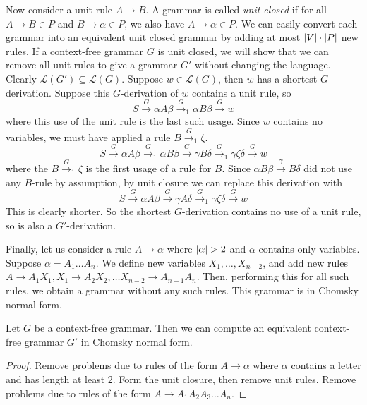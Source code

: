 Now consider a unit rule \( A \to B \).
A grammar is called \emph{unit closed} if for all \( A \to B \in P \) and \( B \to \alpha \in P \), we also have \( A \to \alpha \in P \).
We can easily convert each grammar into an equivalent unit closed grammar by adding at most \( \abs{V} \cdot \abs{P} \) new rules.
If a context-free grammar \( G \) is unit closed, we will show that we can remove all unit rules to give a grammar \( G' \) without changing the language.
Clearly \( \mathcal L(G') \subseteq \mathcal L(G) \).
Suppose \( w \in \mathcal L(G) \), then \( w \) has a shortest \( G \)-derivation.
Suppose this \( G \)-derivation of \( w \) contains a unit rule, so
\[ S \xrightarrow G \alpha A \beta \xrightarrow G_1 \alpha B \beta \xrightarrow G w \]
where this use of the unit rule is the last such usage.
Since \( w \) contains no variables, we must have applied a rule \( B \xrightarrow G_1 \zeta \).
\[ S \xrightarrow G \alpha A \beta \xrightarrow G_1 \alpha B \beta \xrightarrow G \gamma B \delta \xrightarrow G_1 \gamma \zeta \delta \xrightarrow G w \]
where the \( B \xrightarrow G_1 \zeta \) is the first usage of a rule for \( B \).
Since \( \alpha B \beta \xrightarrow \gamma B \delta \) did not use any \( B \)-rule by assumption, by unit closure we can replace this derivation with
\[ S \xrightarrow G \alpha A \beta \xrightarrow G \gamma A \delta \xrightarrow G_1 \gamma \zeta \delta \xrightarrow G w \]
This is clearly shorter.
So the shortest \( G \)-derivation contains no use of a unit rule, so is also a \( G' \)-derivation.

Finally, let us consider a rule \( A \to \alpha \) where \( \abs{\alpha} > 2 \) and \( \alpha \) contains only variables.
Suppose \( \alpha = A_1 \dots A_n \).
We define new variables \( X_1, \dots, X_{n-2} \), and add new rules \( A \to A_1 X_1, X_1 \to A_2 X_2, \dots X_{n-2} \to A_{n-1} A_n \).
Then, performing this for all such rules, we obtain a grammar without any such rules.
This grammar is in Chomsky normal form.
\begin{theorem}[Chomsky]
	Let \( G \) be a context-free grammar.
	Then we can compute an equivalent context-free grammar \( G' \) in Chomsky normal form.
\end{theorem}
\begin{proof}
	Remove problems due to rules of the form \( A \to \alpha \) where \( \alpha \) contains a letter and has length at least 2.
	Form the unit closure, then remove unit rules.
	Remove problems due to rules of the form \( A \to A_1 A_2 A_3 \dots A_n \).
\end{proof}

